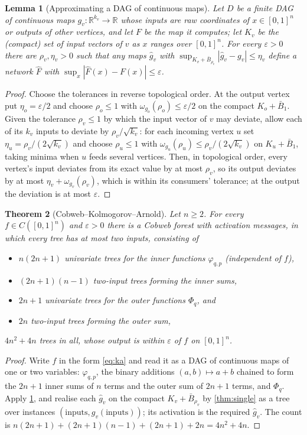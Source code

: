 \documentclass[11pt]{article}
\newtheorem{theorem}{Theorem}
\newtheorem{lemma}[theorem]{Lemma}
\theoremstyle{definition}
\theoremstyle{remark}
\newcommand{\R}{\mathbb{R}}
\begin{document}
\begin{lemma}[Approximating a DAG of continuous maps]\label{lem:dag}
Let $D$ be a finite DAG of continuous maps $g_v:\R^{k_v}\to\R$ whose inputs are raw
coordinates of $x\in[0,1]^n$ or outputs of other vertices, and let $F$ be the map it
computes; let $K_v$ be the (compact) set of input vectors of $v$ as $x$ ranges over
$[0,1]^n$.  For every $\varepsilon>0$ there are $\rho_v,\eta_v>0$ such that any maps
$\hat g_v$ with $\sup_{K_v+\bar B_{\rho_v}}|\hat g_v-g_v|\le\eta_v$ define a network
$\hat F$ with $\sup_x|\hat F(x)-F(x)|\le\varepsilon$.
\end{lemma}
\begin{proof}
Choose the tolerances in reverse topological order.  At the output vertex put
$\eta_o=\varepsilon/2$ and choose $\rho_o\le1$ with
$\omega_{g_o}(\rho_o)\le\varepsilon/2$ on the compact $K_o+\bar B_1$.  Given the
tolerance $\rho_v\le1$ by which the input vector of $v$ may deviate, allow each of its
$k_v$ inputs to deviate by $\rho_v/\sqrt{k_v}$: for each incoming vertex $u$ set
$\eta_u=\rho_v/(2\sqrt{k_v})$ and choose $\rho_u\le1$ with
$\omega_{g_u}(\rho_u)\le\rho_v/(2\sqrt{k_v})$ on $K_u+\bar B_1$, taking minima when $u$
feeds several vertices.  Then, in topological order, every vertex's input deviates from
its exact value by at most $\rho_v$, so its output deviates by at most
$\eta_v+\omega_{g_v}(\rho_v)$, which is within its consumers' tolerance; at the output
the deviation is at most $\varepsilon$.
\end{proof}

\begin{theorem}[Cobweb--Kolmogorov--Arnold]\label{thm:cka}
Let $n\ge2$.  For every $f\in C([0,1]^n)$ and $\varepsilon>0$ there is a Cobweb forest
with activation messages, in which every tree has at most two inputs, consisting of
\begin{itemize}[leftmargin=*,noitemsep]
\item $n(2n+1)$ univariate trees for the inner functions $\varphi_{q,p}$ (independent of
  $f$),
\item $(2n+1)(n-1)$ two-input trees forming the inner sums,
\item $2n+1$ univariate trees for the outer functions $\Phi_q$, and
\item $2n$ two-input trees forming the outer sum,
\end{itemize}
$4n^2+4n$ trees in all, whose output is within $\varepsilon$ of $f$ on $[0,1]^n$.
\end{theorem}
\begin{proof}
Write $f$ in the form \eqref{eq:ka} and read it as a DAG of continuous maps of one or
two variables: $\varphi_{q,p}$, the binary additions $(a,b)\mapsto a+b$ chained to form
the $2n+1$ inner sums of $n$ terms and the outer sum of $2n+1$ terms, and $\Phi_q$.
Apply \cref{lem:dag}, and realise each $\hat g_v$ on the compact
$K_v+\bar B_{\rho_v}$ by \cref{thm:single} as a tree over instances
$(\text{inputs},g_v(\text{inputs}))$; its activation is the required $\hat g_v$.  The
count is $n(2n+1)+(2n+1)(n-1)+(2n+1)+2n=4n^2+4n$.
\end{proof}
\end{document}
